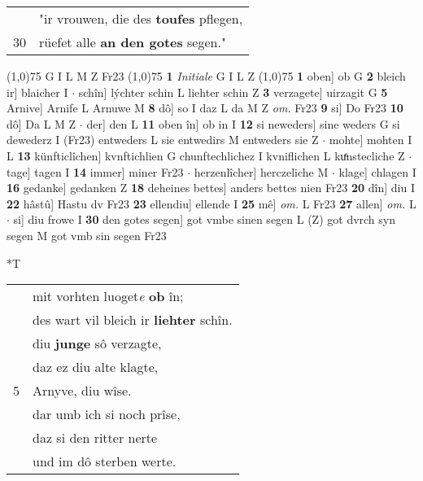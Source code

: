 \documentclass[8pt,a4paper,notitlepage]{article}
\begin{document}
\begin{table}[ht]
\begin{minipage}[t]{0.5\linewidth}
\begin{tabular}{rl}
 & "ir vrouwen, die des \textbf{toufes} pflegen,\\ 
30 & rüefet alle \textbf{an den gotes} segen."\\ 
\end{tabular}
\scriptsize
\line(1,0){75} \newline
G I L M Z Fr23 \newline
\line(1,0){75} \newline
\textbf{1} \textit{Initiale} G I L Z  \newline
\line(1,0){75} \newline
\textbf{1} oben] ob G \textbf{2} bleich ir] blaicher I  $\cdot$ schîn] lýchter schin L liehter schin Z \textbf{3} verzagete] uirzagit G \textbf{5} Arnive] Arnife L Arnuwe M \textbf{8} dô] so I daz L da M Z \textit{om.} Fr23 \textbf{9} si] Do Fr23 \textbf{10} dô] Da L M Z  $\cdot$ der] den L \textbf{11} oben în] ob in I \textbf{12} si neweders] sine weders G si dewederz I (Fr23) entweders L sie entwedirs M entweders sie Z  $\cdot$ mohte] mohten I L \textbf{13} künfticlîchen] kvnftichlien G chunftechlichez I kvniflichen L kuͤnstecliche Z  $\cdot$ tage] tagen I \textbf{14} immer] miner Fr23  $\cdot$ herzenlîcher] herczeliche M  $\cdot$ klage] chlagen I \textbf{16} gedanke] gedanken Z \textbf{18} deheines bettes] anders bettes nien Fr23 \textbf{20} dîn] diu I \textbf{22} hâstû] Hastu dv Fr23 \textbf{23} ellendiu] ellende I \textbf{25} mê] \textit{om.} L Fr23 \textbf{27} allen] \textit{om.} L  $\cdot$ si] diu frowe I \textbf{30} den gotes segen] got vmbe sinen segen L (Z) got dvrch syn segen M got vmb sin segen Fr23 \newline
\end{minipage}
\hspace{0.5cm}
\begin{minipage}[t]{0.5\linewidth}
\small
\begin{center}*T
\end{center}
\begin{tabular}{rl}
 & mit vorhten luoget\textit{e} \textbf{ob} în;\\ 
 & des wart vil bleich ir \textbf{liehter} schîn.\\ 
 & diu \textbf{junge} sô verzagte,\\ 
 & daz ez diu alte klagte,\\ 
5 & Arnyve, diu wîse.\\ 
 & dar umb ich si noch prîse,\\ 
 & daz si den ritter nerte\\ 
 & und im dô sterben werte.\\ 

\end{tabular}
\end{minipage}
\end{table}
\end{document}
